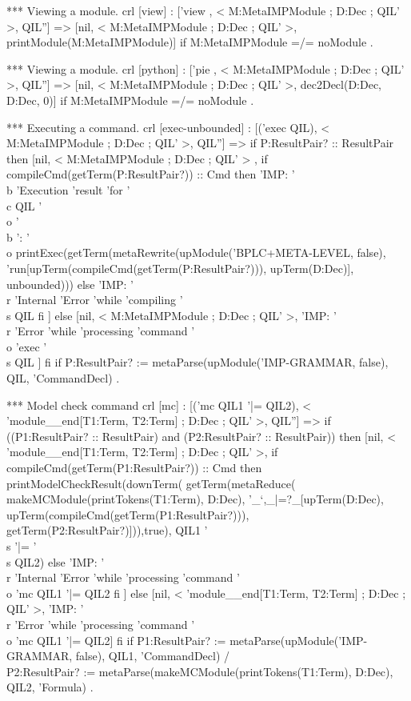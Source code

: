 \documentclass[a4paper,openany]{book}
\begin{document}
 *** Viewing a module.
 crl [view] : ['view , < M:MetaIMPModule ; D:Dec ; QIL' >, QIL''] =>
              [nil, < M:MetaIMPModule ; D:Dec ; QIL' >,
                           printModule(M:MetaIMPModule)]
  if M:MetaIMPModule =/= noModule .

 *** Viewing a module.
 crl [python] : ['pie , < M:MetaIMPModule ; D:Dec ; QIL' >, QIL''] =>
                [nil, < M:MetaIMPModule ; D:Dec ; QIL' >,
                      dec2Decl(D:Dec, D:Dec, 0)]
  if M:MetaIMPModule =/= noModule .

 *** Executing a command.
 crl [exec-unbounded] : [('exec QIL), 
                         < M:MetaIMPModule ; D:Dec ; QIL' >, QIL''] =>
  if P:ResultPair? :: ResultPair
  then [nil, < M:MetaIMPModule ; D:Dec ; QIL' > ,
        if compileCmd(getTerm(P:ResultPair?)) :: Cmd
        then
          'IMP: '\\b 'Execution 'result 'for '\\c QIL '\\o '\\b ': '\\o
          printExec(getTerm(metaRewrite(upModule('BPLC+META-LEVEL, false),
           'run[upTerm(compileCmd(getTerm(P:ResultPair?))), 
                upTerm(D:Dec)], unbounded)))
        else 'IMP: '\\r 'Internal 'Error 'while 'compiling '\\s QIL
        fi ]
  else [nil, < M:MetaIMPModule ; D:Dec ; QIL' >,
        'IMP: '\\r 'Error 'while 'processing 'command '\\o 'exec '\\s QIL ]
  fi
  if P:ResultPair? :=
     metaParse(upModule('IMP-GRAMMAR, false), QIL, 'CommandDecl) .

 *** Model check command
 crl [mc] : [('mc QIL1 '|= QIL2), 
             < 'module__end[T1:Term, T2:Term] ; D:Dec ; QIL' >, QIL''] =>
  if ((P1:ResultPair? :: ResultPair) and (P2:ResultPair? :: ResultPair))
  then [nil, < 'module__end[T1:Term, T2:Term] ; D:Dec ; QIL' >,
        if compileCmd(getTerm(P1:ResultPair?)) :: Cmd
        then
         printModelCheckResult(downTerm(
          getTerm(metaReduce(
           makeMCModule(printTokens(T1:Term), D:Dec),
            '_`,_|=?_[upTerm(D:Dec),
           upTerm(compileCmd(getTerm(P1:ResultPair?))),
            getTerm(P2:ResultPair?)])),true), QIL1 '\\s '|= '\\s QIL2)
        else 'IMP: '\\r 'Internal 'Error 'while 
             'processing 'command '\\o 'mc QIL1 '|= QIL2
        fi ]
  else [nil, < 'module__end[T1:Term, T2:Term] ; D:Dec ; QIL' >,
               'IMP: '\\r 'Error 'while 'processing 'command '\\o 
               'mc QIL1 '|= QIL2]
  fi
 if P1:ResultPair? := 
       metaParse(upModule('IMP-GRAMMAR, false), QIL1, 'CommandDecl) /\\
    P2:ResultPair? := 
       metaParse(makeMCModule(printTokens(T1:Term), D:Dec), QIL2, 'Formula) .
\end{document}
